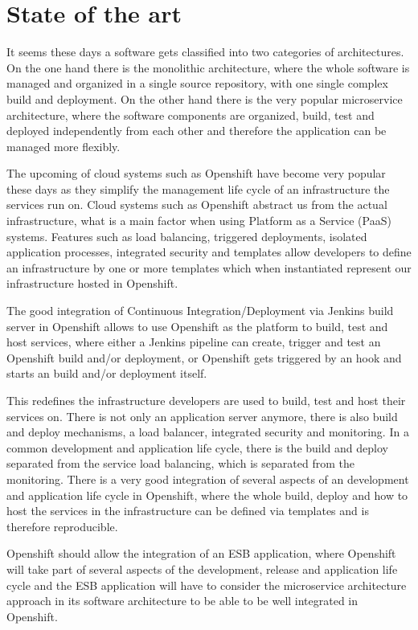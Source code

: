 \section{State of the art}
\label{sec:state-of-the-art}
It seems these days a software gets classified into two categories of architectures. On the one hand there is the monolithic architecture, where the whole software is managed and organized in a single source repository, with one single complex build and deployment. On the other hand there is the very popular microservice architecture, where the software components are organized, build, test and deployed independently from each other and therefore the application can be managed more flexibly.

The upcoming of cloud systems such as Openshift have become very popular these days as they simplify the management life cycle of an infrastructure the services run on. Cloud systems such as Openshift abstract us from the actual infrastructure, what is a main factor when using Platform as a Service (PaaS) systems. Features such as load balancing, triggered deployments, isolated application processes, integrated security and templates allow developers to define an infrastructure by one or more templates which when instantiated represent our infrastructure hosted in Openshift.

The good integration of Continuous Integration/Deployment via Jenkins build server in Openshift allows to use Openshift as the platform to build, test and host services, where either a Jenkins pipeline can create, trigger and test an Openshift build and/or deployment, or Openshift gets triggered by an hook and starts an build and/or deployment itself.

This redefines the infrastructure developers are used to build, test and host their services on. There is not only an application server anymore, there is also build and deploy mechanisms, a load balancer, integrated security and monitoring. In a common development and application life cycle, there is the build and deploy separated from the service load balancing, which is separated from the monitoring. There is a very good integration of several aspects of an development and application life cycle in Openshift, where the whole build, deploy and how to host the services in the infrastructure can be defined via templates and is therefore reproducible.

Openshift should allow the integration of an ESB application, where Openshift will take part of several aspects of the development, release and application life cycle and the ESB application will have to consider the microservice architecture approach in its software architecture to be able to be well integrated in Openshift.

